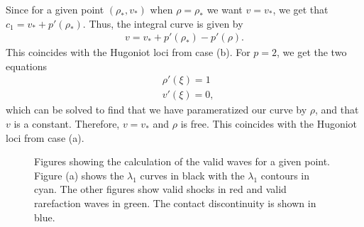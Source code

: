 \documentclass{article}
\begin{document}
Since for a given point $(\rho_*, v_*)$ when $\rho = \rho_*$ we want 
$v = v_*$, we get that $c_1 = v_* + p'(\rho_*)$. Thus, the integral curve 
is given by 
\begin{align*}
v = v_* + p'(\rho_*) - p'(\rho ).
\end{align*}
This coincides with the Hugoniot loci from case (b). For $p = 2$, we get the 
two equations
\begin{align*}
&\rho'(\xi ) = 1 \\
&v'(\xi ) = 0,
\end{align*}
which can be solved to find that we have parameratized our curve by $\rho$, 
and that $v$ is a constant. Therefore, $v = v_*$ and $\rho$ is free. 
This coincides with the Hugoniot loci from case (a).

\begin{figure}[H]
 \centering
 \caption[Optional caption for list of figures]
 {Figures showing the calculation of the valid waves for a given point. Figure (a)
  shows the $\lambda_1$ curves in black with the $\lambda_1$ contours 
  in cyan. The other figures show valid shocks in red and valid rarefaction 
  waves in green. The contact discontinuity is shown in blue.}
   \label{fig:AR_validity}
\end{figure}
\end{document}
